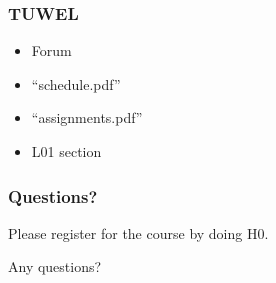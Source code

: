\begin{frame}
	\frametitle{TUWEL}

	\begin{itemize}
	\item Forum
	\item ``schedule.pdf''
	\item ``assignments.pdf''
	\item L01 section
	\end{itemize}
\end{frame}

\begin{assignment}
	\frametitle{Questions?}
	\begin{task}
	Please register for the course by doing H0.
	\end{task}

	\begin{task}
	Any questions?
	\end{task}
\end{assignment}



\nocite{raab2017introducing}

\appendix

\begin{frame}[allowframebreaks]
	
	
\end{frame}




